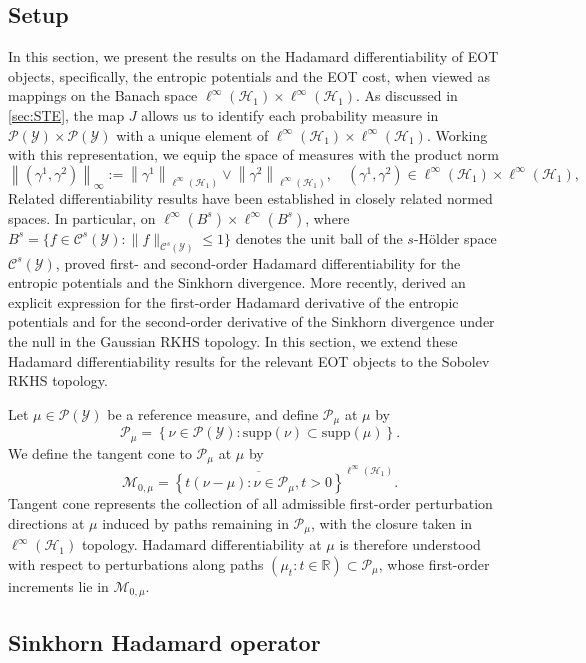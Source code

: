 \documentclass{article}
\theoremstyle{plain}
\theoremstyle{definition}
\theoremstyle{remark}
\newcommand{\R}{\mathbb{R}}
\newcommand{\offf}[1]{\left\{#1\right\}}
\newcommand{\cH}{\mathcal{H}}
\newcommand{\cP}{\mathcal{P}}
\newcommand{\cC}{\mathcal{C}}
\newcommand{\cM}{\mathcal{M}}
\newcommand{\cY}{\mathcal{Y}}
\newcommand{\1}{\mathbbm{1}}
\newcommand{\spt}{\text{supp}}
\newcommand{\norm}[1]{\left \| #1 \right \|}
\theoremstyle{plain}
\theoremstyle{definition}
\begin{document}
\subsection{Setup}
In this section, we present the results on the Hadamard differentiability of EOT objects, specifically, the entropic potentials and the EOT cost, when viewed as mappings on the Banach space $\ell^\infty(\cH_1) \times \ell^\infty(\cH_1)$. As discussed in \cref{sec:STE}, the map $J$ allows us to identify each probability measure in $\cP(\cY) \times \cP(\cY)$ with a unique element of $\ell^\infty(\cH_1) \times \ell^\infty(\cH_1)$. Working with this representation, we equip the space of measures with the product norm
\[
\norm{(\gamma^1, \gamma^2)}_{\infty} := \norm{\gamma^1}_{\ell^\infty(\cH_1)} \lor \norm{\gamma^2}_{\ell^\infty(\cH_1)}, \quad  (\gamma^1, \gamma^2) \in \ell^\infty(\cH_1) \times \ell^\infty(\cH_1), 
\]
Related differentiability results have been established in closely related normed spaces. In particular, on $\ell^\infty(B^s) \times \ell^\infty(B^s)$, where $B^s = \{f \in \cC^s(\cY) : \|f\|_{\cC^s(\cY)} \leq 1\}$ denotes the unit ball of the $s$-Hölder space $\cC^s(\cY)$, \citet{goldfeld2024limit} proved first- and second-order Hadamard differentiability for the entropic potentials and the Sinkhorn divergence. More recently, \citet{kokot2025coreset} derived an explicit expression for the first-order Hadamard derivative of the entropic potentials and for the second-order derivative of the Sinkhorn divergence under the null in the Gaussian RKHS topology. In this section, we extend these Hadamard differentiability results for the relevant EOT objects to the Sobolev RKHS topology.

Let $\mu \in \cP(\cY)$ be a reference measure, and define $\cP_\mu$ at $\mu$ by 
\[
\cP_\mu = \offf{\nu \in \cP(\cY): \spt(\nu) \subset \spt(\mu)}.
\]
We define the tangent cone to $\cP_\mu$ at $\mu$ by
\[
 \cM_{0, \mu} = \overline{\offf{t(\nu - \mu): \nu \in \cP_\mu, t>0}}^{\ell^\infty(\cH_1)}.
\]
Tangent cone represents the collection of all admissible first-order perturbation directions at $\mu$ induced by paths remaining in $\cP_\mu$, with the closure taken in $\ell^\infty(\cH_1)$ topology.  Hadamard differentiability at $\mu$ is therefore understood with respect to perturbations along paths $(\mu_t: t\in \R) \subset \cP_\mu$, whose first-order increments lie in $\cM_{0, \mu}$. 

\subsection{Sinkhorn Hadamard operator}\label{appendix:sinkhorn_Hadamard_operator}
\end{document}
